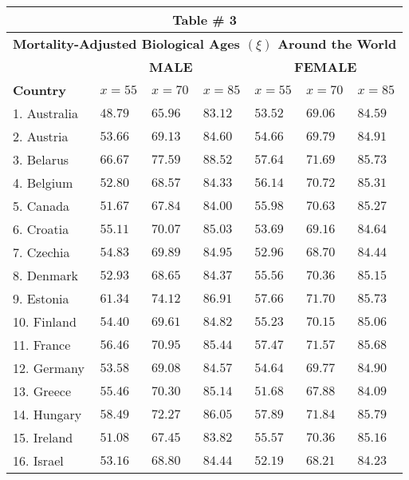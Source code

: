 \documentclass[12pt, titlepage]{article}%
\begin{document}
\clearpage\begin{longtable}{||
    p{95pt}|
    p{35pt}|
    p{35pt}|
    p{35pt}|
    p{35pt}|
    p{35pt}|
    p{35pt}
||}
\hline\hline
\multicolumn{7}{||c||}{Table \# 3 } \\ \hline\hline
\multicolumn{7}{||c||}{{\bf Mortality-Adjusted Biological Ages $(\xi)$ Around the World}}\\ \hline\hline
& \multicolumn{3}{|c|}{{\bf MALE}} &  \multicolumn{3}{|c||}{{\bf FEMALE}} \\ \hline \hline{\bf Country} & $x=55$ &  $x=70$ & $x=85$ & $x=55$ & $x=70$ & $x=85$ \\ \hline \hline
1. Australia & $48.79$ & $65.96$ & $83.12$ & $53.52$ & $69.06$ & $84.59$\\ \hline \hline
2. Austria & $53.66$ & $69.13$ & $84.60$ & $54.66$ & $69.79$ & $84.91$\\ \hline \hline
3. Belarus & $66.67$ & $77.59$ & $88.52$ & $57.64$ & $71.69$ & $85.73$\\ \hline \hline
4. Belgium & $52.80$ & $68.57$ & $84.33$ & $56.14$ & $70.72$ & $85.31$\\ \hline \hline
5. Canada & $51.67$ & $67.84$ & $84.00$ & $55.98$ & $70.63$ & $85.27$\\ \hline \hline
6. Croatia & $55.11$ & $70.07$ & $85.03$ & $53.69$ & $69.16$ & $84.64$\\ \hline \hline
7. Czechia & $54.83$ & $69.89$ & $84.95$ & $52.96$ & $68.70$ & $84.44$\\ \hline \hline
8. Denmark & $52.93$ & $68.65$ & $84.37$ & $55.56$ & $70.36$ & $85.15$\\ \hline \hline
9. Estonia & $61.34$ & $74.12$ & $86.91$ & $57.66$ & $71.70$ & $85.73$\\ \hline \hline
10. Finland & $54.40$ & $69.61$ & $84.82$ & $55.23$ & $70.15$ & $85.06$\\ \hline \hline
11. France & $56.46$ & $70.95$ & $85.44$ & $57.47$ & $71.57$ & $85.68$\\ \hline \hline
12. Germany & $53.58$ & $69.08$ & $84.57$ & $54.64$ & $69.77$ & $84.90$\\ \hline \hline
13. Greece & $55.46$ & $70.30$ & $85.14$ & $51.68$ & $67.88$ & $84.09$\\ \hline \hline
14. Hungary & $58.49$ & $72.27$ & $86.05$ & $57.89$ & $71.84$ & $85.79$\\ \hline \hline
15. Ireland & $51.08$ & $67.45$ & $83.82$ & $55.57$ & $70.36$ & $85.16$\\ \hline \hline
16. Israel & $53.16$ & $68.80$ & $84.44$ & $52.19$ & $68.21$ & $84.23$\\ \hline \hline

\end{longtable}
\end{document}
